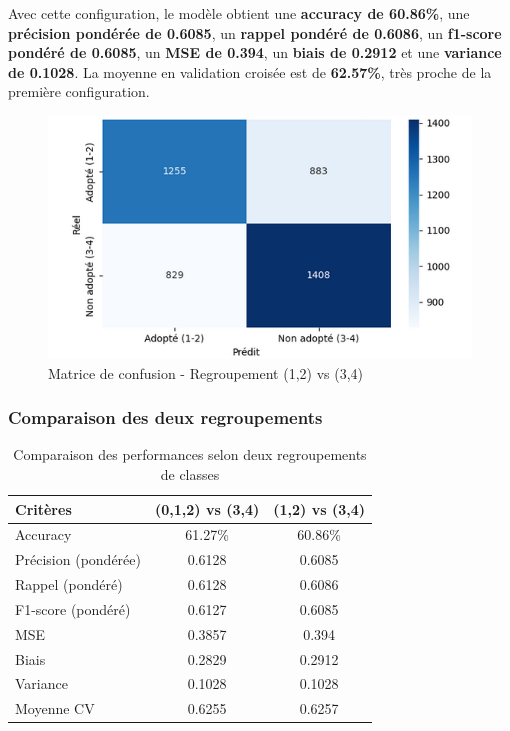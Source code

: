 \documentclass[a4paper,12pt]{article}
\begin{document}
Avec cette configuration, le modèle obtient une \textbf{accuracy de 60.86\%}, une \textbf{précision pondérée de 0.6085}, un \textbf{rappel pondéré de 0.6086}, un \textbf{f1-score pondéré de 0.6085}, un \textbf{MSE de 0.394}, un \textbf{biais de 0.2912} et une \textbf{variance de 0.1028}. La moyenne en validation croisée est de \textbf{62.57\%}, très proche de la première configuration.

\begin{figure}[H]
    \centering
    \includegraphics[width=0.7\linewidth]{matrice2.png}
    \caption{Matrice de confusion - Regroupement (1,2) vs (3,4)}
    \label{fig:rf_confusion_groupe12}
\end{figure}

\subsubsection*{Comparaison des deux regroupements}

\begin{table}[H]
    \centering
    \begin{tabular}{|l|c|c|}
        \hline
        \textbf{Critères} & \textbf{(0,1,2) vs (3,4)} & \textbf{(1,2) vs (3,4)} \\
        \hline
        Accuracy & 61.27\% & 60.86\% \\
        Précision (pondérée) & 0.6128 & 0.6085 \\
        Rappel (pondéré) & 0.6128 & 0.6086 \\
        F1-score (pondéré) & 0.6127 & 0.6085 \\
        MSE & 0.3857 & 0.394 \\
        Biais & 0.2829 & 0.2912 \\
        Variance & 0.1028 & 0.1028 \\
        Moyenne CV & 0.6255 & 0.6257 \\
        \hline
    \end{tabular}
    \caption{Comparaison des performances selon deux regroupements de classes}
    \label{tab:rf_comparaison_regroupements}
\end{table}
\end{document}
